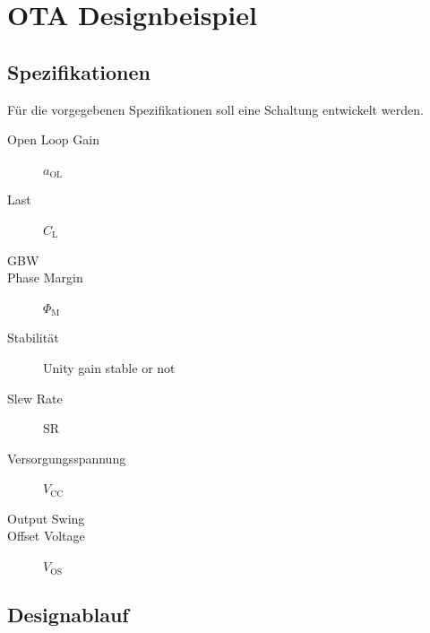 \section{OTA Designbeispiel}

\subsection{Spezifikationen}

Für die vorgegebenen Spezifikationen soll eine Schaltung entwickelt werden.

\vspace{-0.3cm}

\begingroup
\setlength{\columnseprule}{0pt}
\begin{multicols}{2}
    \begin{description}
        \item[Open Loop Gain] $a_\text{OL}$
        \item[Last] $C_\text{L}$
        \item[GBW]  
        \item[Phase Margin] $\Phi_\text{M}$
        \item[Stabilität] Unity gain stable or not
        \item[Slew Rate] SR
        \item[Versorgungsspannung] $V_\text{CC}$
        \item[Output Swing]
        \item[Offset Voltage] $V_\text{OS}$
    \end{description}
\end{multicols}
\endgroup



\subsection{Designablauf}

